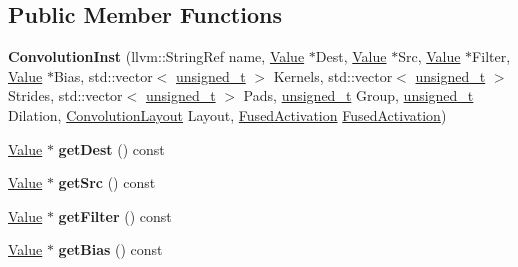 \subsection*{Public Member Functions}
\begin{DoxyCompactItemize}
\item 
\mbox{\label{classglow_1_1_convolution_inst_a8e07473549fb69cdefc793edc0c2a820}} 
{\bfseries Convolution\+Inst} (llvm\+::\+String\+Ref name, \hyperlink{classglow_1_1_value}{Value} $\ast$Dest, \hyperlink{classglow_1_1_value}{Value} $\ast$Src, \hyperlink{classglow_1_1_value}{Value} $\ast$Filter, \hyperlink{classglow_1_1_value}{Value} $\ast$Bias, std\+::vector$<$ \hyperlink{namespaceglow_a0ca574644e1e42ef193a9947fb4d8911}{unsigned\+\_\+t} $>$ Kernels, std\+::vector$<$ \hyperlink{namespaceglow_a0ca574644e1e42ef193a9947fb4d8911}{unsigned\+\_\+t} $>$ Strides, std\+::vector$<$ \hyperlink{namespaceglow_a0ca574644e1e42ef193a9947fb4d8911}{unsigned\+\_\+t} $>$ Pads, \hyperlink{namespaceglow_a0ca574644e1e42ef193a9947fb4d8911}{unsigned\+\_\+t} Group, \hyperlink{namespaceglow_a0ca574644e1e42ef193a9947fb4d8911}{unsigned\+\_\+t} Dilation, \hyperlink{namespaceglow_aa2f3a33e05699df0f42295c5c4bd1f77}{Convolution\+Layout} Layout, \hyperlink{namespaceglow_ae88f2cc9ccac93130ee1cc326d968a21}{Fused\+Activation} \hyperlink{namespaceglow_ae88f2cc9ccac93130ee1cc326d968a21}{Fused\+Activation})
\item 
\mbox{\label{classglow_1_1_convolution_inst_a6fb5870e983f022a370de75031d45122}} 
\hyperlink{classglow_1_1_value}{Value} $\ast$ {\bfseries get\+Dest} () const
\item 
\mbox{\label{classglow_1_1_convolution_inst_aa64af0e7750759dd56e9a0ed28623e2a}} 
\hyperlink{classglow_1_1_value}{Value} $\ast$ {\bfseries get\+Src} () const
\item 
\mbox{\label{classglow_1_1_convolution_inst_a16deb31486aa09a1f843c1bd8698063a}} 
\hyperlink{classglow_1_1_value}{Value} $\ast$ {\bfseries get\+Filter} () const
\item 
\mbox{\label{classglow_1_1_convolution_inst_a29eadd5ecf87f8cb1d2cd65a079f7c32}} 
\hyperlink{classglow_1_1_value}{Value} $\ast$ {\bfseries get\+Bias} () const

\end{DoxyCompactItemize}
